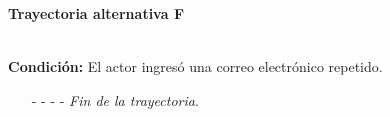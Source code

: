 \hypertarget{CU3-2:TAF}{\textbf{Trayectoria alternativa F}}\\
\noindent \textbf{Condición:} El actor ingresó una correo electrónico repetido.
\begin{enumerate}
	\UCpaso[\UCsist] Envía un correo con el mensaje  a la nueva cuenta de correo electrónico proporcionada por el actor.
	\UCpaso Regresa al paso \ref{CU3.2-P5} de la trayectoria principal.
	\item[- -] - - {\em {Fin de la trayectoria}}.
\end{enumerate}